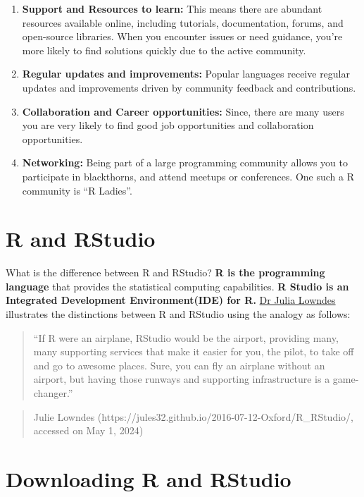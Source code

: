 \documentclass[
  letterpaper,
  DIV=11,
  numbers=noendperiod]{scrreprt}
\begin{document}
\begin{enumerate}
\def\labelenumi{\arabic{enumi}.}
\item
  \textbf{Support and Resources to learn:} This means there are abundant
  resources available online, including tutorials, documentation,
  forums, and open-source libraries. When you encounter issues or need
  guidance, you're more likely to find solutions quickly due to the
  active community.
\item
  \textbf{Regular updates and improvements:} Popular languages receive
  regular updates and improvements driven by community feedback and
  contributions.
\item
  \textbf{Collaboration and Career opportunities:} Since, there are many
  users you are very likely to find good job opportunities and
  collaboration opportunities.
\item
  \textbf{Networking:} Being part of a large programming community
  allows you to participate in blackthorns, and attend meetups or
  conferences. One such a R community is ``R Ladies''.
\end{enumerate}

\section{R and RStudio}\label{r-and-rstudio}

What is the difference between R and RStudio? \textbf{R is the
programming language} that provides the statistical computing
capabilities. \textbf{R Studio is an Integrated Development
Environment(IDE) for R.} \href{https://jules32.github.io/}{Dr Julia
Lowndes} illustrates the distinctions between R and RStudio using the
analogy as follows:

\begin{quote}
``If R were an airplane, RStudio would be the airport, providing many,
many supporting services that make it easier for you, the pilot, to take
off and go to awesome places. Sure, you can fly an airplane without an
airport, but having those runways and supporting infrastructure is a
game-changer.''
\end{quote}

\begin{quote}
Julie Lowndes (https://jules32.github.io/2016-07-12-Oxford/R\_RStudio/,
accessed on May 1, 2024)
\end{quote}

\section{Downloading R and RStudio}\label{downloading-r-and-rstudio}
\end{document}
